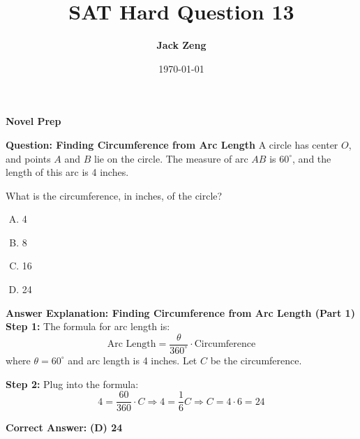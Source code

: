 \documentclass{beamer}
\title[SAT Hard Question]{\textbf{SAT Hard Question 13}}
\author{\textbf{Jack Zeng}}
\institute{\textcolor{white}{\textbf{Novel Prep}}}
\date{\today}
\begin{document}
\begin{frame}
    \titlepage
    \vfill
    \begin{flushright}
        \textcolor{purpleblue}{\Huge \textbf{Novel Prep}}
    \end{flushright}
\end{frame}


\begin{frame}
\end{frame}


\begin{frame}{\textbf{Question: Finding Circumference from Arc Length}}
A circle has center \( O \), and points \( A \) and \( B \) lie on the circle. The measure of arc \( AB \) is \( 60^\circ \), and the length of this arc is 4 inches.  

What is the circumference, in inches, of the circle?

\begin{enumerate}[A.]
    \item 4
    \item 8
    \item 16
    \item 24
\end{enumerate}
\end{frame}


\begin{frame}{\textbf{Answer Explanation: Finding Circumference from Arc Length (Part 1)}}
\textbf{Step 1:}  
The formula for arc length is:  
\[
\text{Arc Length} = \frac{\theta}{360^\circ} \cdot \text{Circumference}
\]  
where \( \theta = 60^\circ \) and arc length is 4 inches.  
Let \( C \) be the circumference.

\pause

\textbf{Step 2:} Plug into the formula:  
\[
4 = \frac{60}{360} \cdot C
\Rightarrow 4 = \frac{1}{6}C
\Rightarrow C = 4 \cdot 6 = \boxed{24}
\]

\textbf{Correct Answer:} \textbf{(D) 24}
\end{frame}
\end{document}

